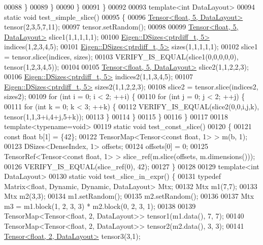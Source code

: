 \begin{DoxyCode}
00088       \}
00089     \}
00090   \}
00091 \}
00092 
00093 \textcolor{keyword}{template}<\textcolor{keywordtype}{int} DataLayout>
00094 \textcolor{keyword}{static} \textcolor{keywordtype}{void} test\_simple\_slice()
00095 \{
00096   \hyperlink{class_eigen_1_1_tensor}{Tensor<float, 5, DataLayout>} tensor(2,3,5,7,11);
00097   tensor.setRandom();
00098 
00099   \hyperlink{class_eigen_1_1_tensor}{Tensor<float, 5, DataLayout>} slice1(1,1,1,1,1);
00100   \hyperlink{struct_eigen_1_1_d_sizes}{Eigen::DSizes<ptrdiff\_t, 5>} indices(1,2,3,4,5);
00101   \hyperlink{struct_eigen_1_1_d_sizes}{Eigen::DSizes<ptrdiff\_t, 5>} sizes(1,1,1,1,1);
00102   slice1 = tensor.slice(indices, sizes);
00103   VERIFY\_IS\_EQUAL(slice1(0,0,0,0,0), tensor(1,2,3,4,5));
00104 
00105   \hyperlink{class_eigen_1_1_tensor}{Tensor<float, 5, DataLayout>} slice2(1,1,2,2,3);
00106   \hyperlink{struct_eigen_1_1_d_sizes}{Eigen::DSizes<ptrdiff\_t, 5>} indices2(1,1,3,4,5);
00107   \hyperlink{struct_eigen_1_1_d_sizes}{Eigen::DSizes<ptrdiff\_t, 5>} sizes2(1,1,2,2,3);
00108   slice2 = tensor.slice(indices2, sizes2);
00109   \textcolor{keywordflow}{for} (\textcolor{keywordtype}{int} i = 0; i < 2; ++i) \{
00110     \textcolor{keywordflow}{for} (\textcolor{keywordtype}{int} j = 0; j < 2; ++j) \{
00111       \textcolor{keywordflow}{for} (\textcolor{keywordtype}{int} k = 0; k < 3; ++k) \{
00112         VERIFY\_IS\_EQUAL(slice2(0,0,i,j,k), tensor(1,1,3+i,4+j,5+k));
00113       \}
00114     \}
00115   \}
00116 \}
00117 
00118 \textcolor{keyword}{template}<\textcolor{keyword}{typename}=\textcolor{keywordtype}{void}>
00119 \textcolor{keyword}{static} \textcolor{keywordtype}{void} test\_const\_slice()
00120 \{
00121   \textcolor{keyword}{const} \textcolor{keywordtype}{float} b[1] = \{42\};
00122   TensorMap<Tensor<const float, 1> > m(b, 1);
00123   DSizes<DenseIndex, 1> offsets;
00124   offsets[0] = 0;
00125   TensorRef<Tensor<const float, 1> > slice\_ref(m.slice(offsets, m.dimensions()));
00126   VERIFY\_IS\_EQUAL(slice\_ref(0), 42);
00127 \}
00128 
00129 \textcolor{keyword}{template}<\textcolor{keywordtype}{int} DataLayout>
00130 \textcolor{keyword}{static} \textcolor{keywordtype}{void} test\_slice\_in\_expr() \{
00131   \textcolor{keyword}{typedef} Matrix<float, Dynamic, Dynamic, DataLayout> Mtx;
00132   Mtx m1(7,7);
00133   Mtx m2(3,3);
00134   m1.setRandom();
00135   m2.setRandom();
00136 
00137   Mtx m3 = m1.block(1, 2, 3, 3) * m2.block(0, 2, 3, 1);
00138 
00139   TensorMap<Tensor<float, 2, DataLayout>> tensor1(m1.data(), 7, 7);
00140   TensorMap<Tensor<float, 2, DataLayout>> tensor2(m2.data(), 3, 3);
00141   \hyperlink{class_eigen_1_1_tensor}{Tensor<float, 2, DataLayout>} tensor3(3,1);

\end{DoxyCode}
